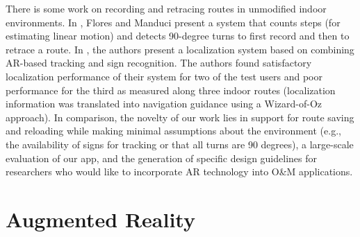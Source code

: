\documentclass[chi_draft]{sigchi}
\newcommand{\BVI}{B/VI\xspace}
\newcommand{\OM}{O\&M\xspace}
\begin{document}
There is some work on recording and retracing routes in unmodified indoor environments.  In \cite{flores2018easy, flores2014ariadne}, Flores and Manduci present a system that counts steps (for estimating linear motion) and detects 90-degree turns to first record and then to retrace a route.  In \cite{fusco2018indoor}, the authors present a localization system based on combining AR-based tracking and sign recognition.  The authors found satisfactory localization performance of their system for two of the test users and poor performance for the third as measured along three indoor routes (localization information was translated into navigation guidance using a Wizard-of-Oz approach).  In comparison, the novelty of our work lies in support for route saving and reloading while making minimal assumptions about the environment (e.g., the availability of signs for tracking or that all turns are 90 degrees), a large-scale evaluation of our app, and the generation of specific design guidelines for researchers who would like to incorporate AR technology into \OM applications.


\section{Augmented Reality}
%
\end{document}
